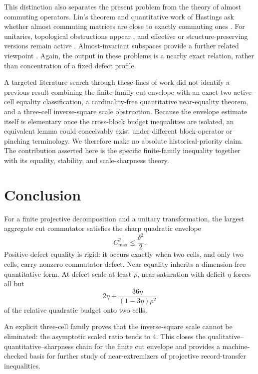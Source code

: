 \documentclass[11pt]{article}
\newcommand{\cmax}{C_{\max}}
\newcommand{\dd}{\delta}
\newcommand{\etaq}{\eta}
\begin{document}
This distinction also separates the present problem from the theory of
almost commuting operators.  Lin's theorem and quantitative work of Hastings
ask whether almost commuting matrices are close to exactly commuting ones
\cite{Lin1997AlmostCommuting,FriisRordam1996,Hastings2009}.  For unitaries,
topological obstructions appear
\cite{Voiculescu1983,ExelLoring1989,ExelLoring1991}, and effective or
structure-preserving versions remain active
\cite{DorOnHallKachkovskiy2025,Herrera2024,Herrera2026}.  Almost-invariant
subspaces provide a further related viewpoint
\cite{MarcouxPopovRadjavi2013}.  Again, the output in these problems is a
nearby exact relation, rather than concentration of a fixed defect profile.

A targeted literature search through these lines of work did not identify a
previous result combining the finite-family cut envelope with an exact
two-active-cell equality classification, a cardinality-free quantitative
near-equality theorem, and a three-cell inverse-square scale obstruction.
Because the envelope estimate itself is elementary once the cross-block
budget inequalities are isolated, an equivalent lemma could conceivably
exist under different block-operator or pinching terminology.  We therefore
make no absolute historical-priority claim.  The contribution asserted here
is the specific finite-family inequality together with its equality,
stability, and scale-sharpness theory.

\section{Conclusion}

For a finite projective decomposition and a unitary transformation, the
largest aggregate cut commutator satisfies the sharp quadratic envelope
\[
  \cmax^2\le\frac{\dd^2}{2}.
\]
Positive-defect equality is rigid: it occurs exactly when two cells, and only
two cells, carry nonzero commutator defect.  Near equality inherits a
dimension-free quantitative form.  At defect scale at least $\rho$,
near-saturation with deficit $\etaq$ forces all but
\[
  2\etaq+
  \frac{36\etaq}{(1-3\etaq)\rho^2}
\]
of the relative quadratic budget onto two cells.

An explicit three-cell family proves that the inverse-square scale cannot be
eliminated: the asymptotic scaled ratio tends to $4$.  This closes the
qualitative--quantitative--sharpness chain for the finite cut envelope and
provides a machine-checked basis for further study of near-extremizers of
projective record-transfer inequalities.
\end{document}

